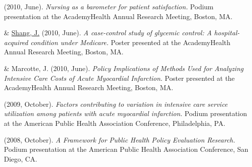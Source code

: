 \documentclass[10pt,]{article}
\begin{document}
{{{{{{{{{{{{{{\begin{hangparas}{.25in}{1}

 (2010, June). {\textit {Nursing as a barometer for patient satisfaction.}} Podium presentation at the AcademyHealth Annual Research Meeting, Boston, MA.

\end{hangparas}

\vspace{4mm}

\begin{hangparas}{.25in}{1}

 \& {\underline {Shang, J.}} (2010, June). {\textit {A case-control study of glycemic control: A hospital-acquired condition under Medicare.}} Poster presented at the AcademyHealth Annual Research Meeting, Boston, MA.

\end{hangparas}

\vspace{4mm}

\begin{hangparas}{.25in}{1}

 \& Marcotte, J. (2010, June). {\textit {Policy Implications of Methods Used for Analyzing Intensive Care Costs of Acute Myocardial Infarction.}} Poster presented at the AcademyHealth Annual Research Meeting, Boston, MA.

\end{hangparas}

\vspace{4mm}

\begin{hangparas}{.25in}{1}

 (2009, October). {\textit {Factors contributing to variation in intensive care service utilization among patients with acute myocardial infarction.}} Podium presentation at the American Public Health Association Conference, Philadelphia, PA.

\end{hangparas}

\vspace{4mm}

\begin{hangparas}{.25in}{1}

 (2008, October). {\textit {A Framework for Public Health Policy Evaluation Research.}} Podium presentation at the American Public Health Association Conference, San Diego, CA.


\end{hangparas}}}}}}}}}}}}}}}
\end{document}
